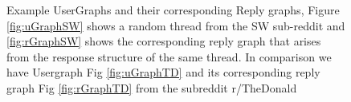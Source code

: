 \begin{figure}[!ht]
	\caption{ Example UserGraphs and their corresponding Reply graphs, Figure \ref{fig:uGraphSW} shows a random thread from the SW sub-reddit and \ref{fig:rGraphSW} shows the corresponding reply graph that arises from the response structure of the same thread. In comparison we have Usergraph Fig \ref{fig:uGraphTD} and its corresponding reply graph Fig \ref{fig:rGraphTD} from the subreddit r/TheDonald }
	\label{Fig:GraphExamples}
\end{figure}


